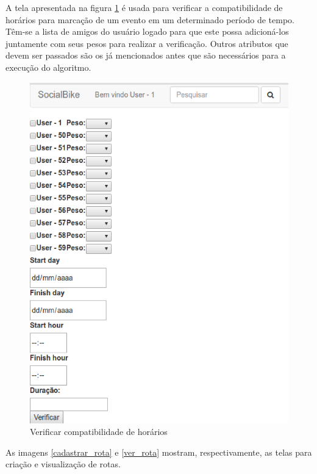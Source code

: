 A tela apresentada na figura \ref{compatibilidade_horarios} é usada para verificar a compatibilidade de horários para marcação de um evento em um determinado período de tempo. Têm-se a lista de amigos do usuário logado para que este possa adicioná-los juntamente com seus pesos para realizar a verificação. Outros atributos que devem ser passados são os já mencionados antes que são necessários para a execução do algoritmo.

\newpage
\begin{figure}[!h]
	\centering
	\includegraphics[scale=0.5]{figuras/resultados/compatibilidade_horarios.eps}
	\caption[Verificar compatibilidade de horários]{Verificar compatibilidade de horários}
	\label{compatibilidade_horarios}
\end{figure}

As imagens \ref{cadastrar_rota} e \ref{ver_rota} mostram, respectivamente, as telas para criação e visualização de rotas.

